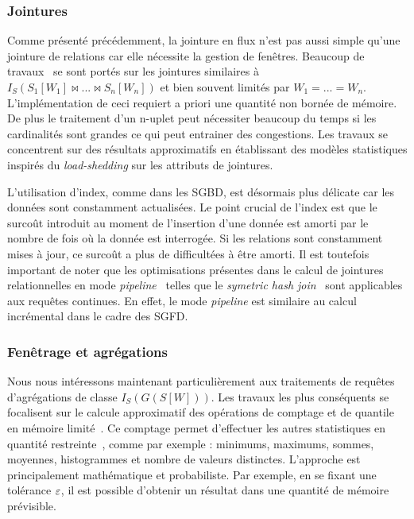 \subsubsection{Jointures}
Comme présenté précédemment, la jointure en flux n'est pas aussi simple qu'une jointure de relations car elle nécessite la gestion de fenêtres. Beaucoup de travaux~\cite{Han:join, Srivastava:join, Law:join} se sont portés sur les jointures similaires à $I_S (S_1[W_1] \Join ... \Join S_n[W_n])$ et bien souvent limités par $W_1=...=W_n$. L'implémentation de ceci requiert a priori une quantité non bornée de mémoire. De plus le traitement d'un n-uplet peut nécessiter beaucoup du temps si les cardinalités sont grandes ce qui peut entrainer des congestions. Les travaux se concentrent sur des résultats approximatifs en établissant des modèles statistiques inspirés du \textit{load-shedding} sur les attributs de jointures.

L'utilisation d'index, comme dans les SGBD, est désormais plus délicate car les données sont constamment actualisées. Le point crucial de l'index est que le surcoût introduit au moment de l'insertion d'une donnée est amorti par le nombre de fois où la donnée est interrogée. Si les relations sont constamment mises à jour, ce surcoût a plus de difficultées à être amorti. Il est toutefois important de noter que les optimisations présentes dans le calcul de jointures relationnelles en mode \textit{pipeline}~\cite{Gajski:pipeline} telles que le \textit{symetric hash join}~\cite{Wilschut:symetricjoin} sont applicables aux requêtes continues. En effet, le mode \textit{pipeline} est similaire au calcul incrémental dans le cadre des SGFD.

\subsubsection{Fenêtrage et agrégations}\label{sec:rw:sgfd:optim:fenetres}
Nous nous intéressons maintenant particulièrement aux traitements de requêtes d'agrégations de classe $I_S(G(S[W]))$. Les travaux les plus conséquents se focalisent sur le calcule approximatif des opérations de comptage et de quantile en mémoire limité~\cite{Arasu:window}. Ce comptage permet d'effectuer les autres statistiques en quantité restreinte~\cite{Datar:stats}, comme par exemple : minimums, maximums, sommes, moyennes, histogrammes et nombre de valeurs distinctes. L'approche est principalement mathématique et probabiliste. Par exemple, en se fixant une tolérance $\varepsilon$, il est possible d'obtenir un résultat dans une quantité de mémoire prévisible. 

